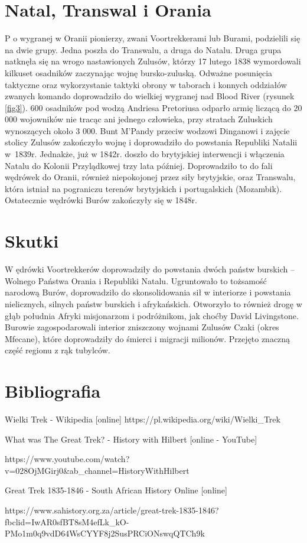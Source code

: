 \documentclass[12pt, twocolumn]{article}
\begin{document}
\section{Natal, Transwal i Orania}
\lettrine{P}{} o wygranej w Oranii pionierzy, zwani Voortrekkerami lub Burami, podzielili się na dwie grupy. Jedna poszła do Transwalu, a druga do Natalu. Druga grupa natknęła się na wrogo nastawionych Zulusów, którzy 17 lutego 1838 wymordowali kilkuset osadników zaczynając wojnę bursko-zuluską. Odważne posunięcia taktyczne oraz wykorzystanie taktyki obrony w taborach i konnych oddziałów zwanych komando doprowadziło do wielkiej wygranej nad Blood River (rysunek \ref{fig3}). 600 osadników pod wodzą Andriesa Pretoriusa odparło armię liczącą do 20 000 wojowników nie tracąc ani jednego człowieka, przy stratach Zuluskich wynoszących około 3 000. Bunt M’Pandy przeciw wodzowi Dinganowi i zajęcie stolicy Zulusów zakończyło wojnę i doprowadziło do powstania Republiki Natalii w~1839r. Jednakże, już w 1842r. doszło do brytyjskiej interwencji i włączenia Natalu do Kolonii Przylądkowej trzy lata później. Doprowadziło to do fali wędrówek do Oranii, również niepokojonej przez siły brytyjskie, oraz Transwalu, która istniał na pograniczu terenów brytyjskich i portugalskich (Mozambik). Ostatecznie wędrówki Burów zakończyły się w 1848r.
\newpage

\section{Skutki}
\lettrine{W}{} ędrówki Voortrekkerów doprowadziły do powstania dwóch państw burskich – Wolnego Państwa Orania i Republiki Natalu. Ugruntowało to tożsamość narodową Burów, doprowadziło do skonsolidowania sił w interiorze i powstania nielicznych, silnych państw burskich i afrykańskich. Otworzyło to również drogę w głąb południa Afryki misjonarzom i podróżnikom, jak choćby David Livingstone. Burowie zagospodarowali interior zniszczony wojnami Zulusów Czaki (okres Mfecane), które doprowadziły do śmierci i migracji milionów. Przejęto znaczną część regionu z rąk tubylców.  

\section{Bibliografia}
\begin{enumerate}
    \item Wielki Trek - Wikipedia [online] 
    \tiny{https://pl.wikipedia.org/wiki/Wielki\_Trek}\normalsize{
    \item What was The Great Trek? - History with Hilbert [online - YouTube]} \tiny{https://www.youtube.com/watch?v=028OjMGirj0\&ab\_channel=HistoryWithHilbert}\normalsize{
    \item Great Trek 1835-1846 - South African History Online [online]} \tiny{https://www.sahistory.org.za/article/great-trek-1835-1846?fbclid=IwAR0sfBT8sM4efLk\_kO-PMo1m0q9vdD64WsCYYF8j2SusPRCiONswqQTCh9k}
\end{enumerate}
\end{document}
